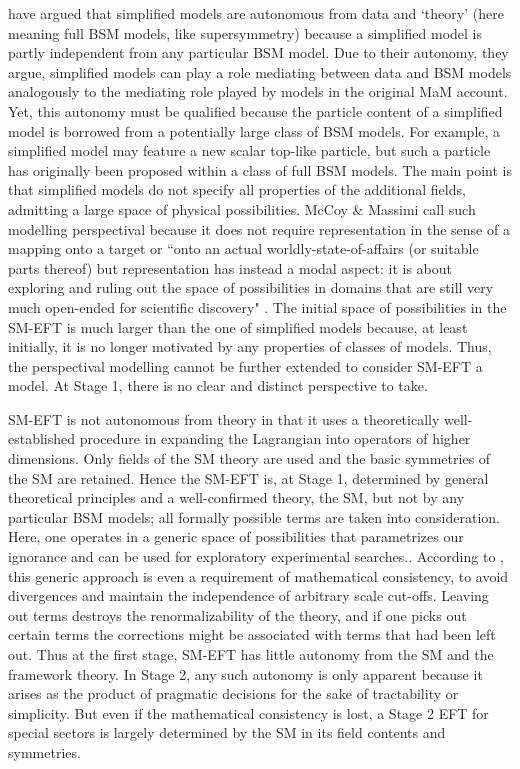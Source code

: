 \citet{mccoymassimi} have argued that simplified models are autonomous from data and `theory' (here meaning full BSM models, like supersymmetry) because a simplified model is partly independent from any particular BSM model. 
Due to their autonomy, they argue, simplified models can play a role mediating between data and BSM models analogously to the mediating role played by models in the original MaM account. 
Yet, this autonomy must be qualified because the particle content of a simplified model is borrowed from a potentially large class of BSM models. 
For example, a simplified model may feature a new scalar top-like particle, but such a particle has originally been proposed within a class of full BSM models. 
The main point is that simplified models do not specify all properties of the additional fields, admitting a large space of physical possibilities.
McCoy \& Massimi call such modelling perspectival because it does not require representation in the sense of a mapping onto a target or ``onto an actual worldly-state-of-affairs (or suitable parts thereof) but representation has instead a modal aspect: it is about exploring and ruling out the space of possibilities in domains that are still very much open-ended for scientific discovery" \citep[p.~338]{mccoymassimi}.
The initial space of possibilities in the SM-EFT is much larger than the one of simplified models because, at least initially, it is no longer motivated by any properties of classes of models. 
Thus, the perspectival modelling cannot be further extended to consider SM-EFT a model.
At Stage 1, there is no clear and distinct perspective to take. 

SM-EFT is not autonomous from theory in that it uses a theoretically well-established procedure in expanding the Lagrangian into operators of higher dimensions. 
Only fields of the SM theory are used and the basic symmetries of the SM are retained. 
Hence the SM-EFT is, at Stage 1, determined by general theoretical principles and a well-confirmed theory, the SM, but not by any particular BSM models; all formally possible terms are taken into consideration.  
Here, one operates in a generic space of possibilities that parametrizes our ignorance and can be used for exploratory experimental searches.. 
According to \cite{wells2011}, this generic approach is even a requirement of mathematical consistency, to avoid divergences and maintain the independence of arbitrary scale cut-offs. 
Leaving out terms destroys the renormalizability of the theory, and if one picks out certain terms the corrections might be associated with terms that had been left out. 
Thus at the first stage, SM-EFT has little autonomy from the SM and the framework theory. 
In Stage 2, any such autonomy is only apparent because it arises as the product of pragmatic decisions for the sake of tractability or simplicity.
But even if the mathematical consistency is lost, a Stage 2 EFT for special sectors is largely determined by the SM in its field contents and symmetries.

